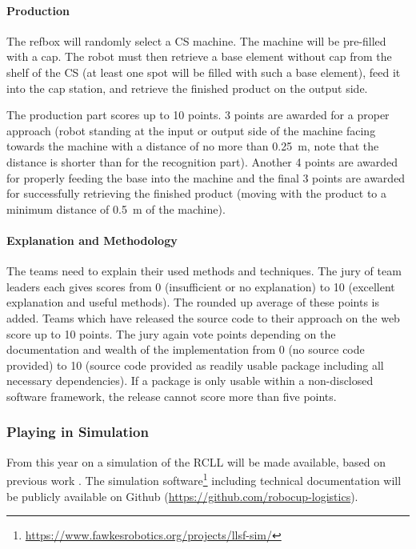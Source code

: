 \documentclass[12pt,twoside]{article}
\begin{document}
\vspace{-2ex}\paragraph{Production}
The refbox will randomly select a CS machine. The machine will be
pre-filled with a cap. The robot must then retrieve a base element
without cap from the shelf of the CS (at least one spot will be filled
with such a base element), feed it into the cap station, and retrieve
the finished product on the output side.

The production part scores up to 10 points. 3 points are awarded for a
proper approach (robot standing at the input or output side of the
machine facing towards the machine with a distance of no more than
\SI{0.25}{\metre}, note that the distance is shorter than for the
recognition part). Another 4 points are awarded for properly feeding
the base into the machine and the final 3 points are awarded for
successfully retrieving the finished product (moving with the product
to a minimum distance of \SI{0.5}{\metre} of the machine).

\vspace{-2ex}\paragraph{Explanation and Methodology}
%
The teams need to explain their used methods and techniques. The jury
of team leaders each gives scores from 0 (insufficient or no
explanation) to 10 (excellent explanation and useful methods). The
rounded up average of these points is added. Teams which have released
the source code to their approach on the web score up to 10
points. The jury again vote points depending on the documentation and
wealth of the implementation from 0 (no source code provided) to 10
(source code provided as readily usable package including all
necessary dependencies). If a package is only usable within a
non-disclosed software framework, the release cannot score more than
five points.


\subsubsection{Playing in Simulation}

From this year on a simulation of the RCLL will be made available,
based on previous work \cite{llsf-sim-rc2014-2014}. The simulation
software\footnote{\url{https://www.fawkesrobotics.org/projects/llsf-sim/}}
including technical documentation will be publicly available on Github
(\url{https://github.com/robocup-logistics}).
\end{document}
